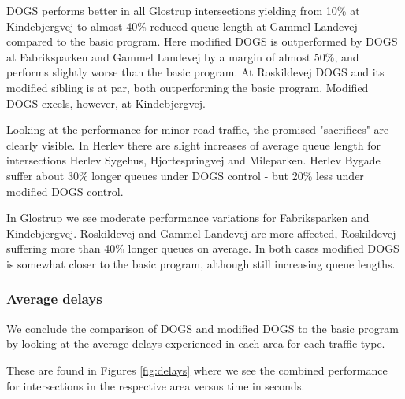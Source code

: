 DOGS performs better in all Glostrup intersections yielding from 10\% at Kindebjergvej to almost 40\% reduced queue length at Gammel Landevej compared to the basic program. Here modified DOGS is outperformed by DOGS at Fabriksparken and Gammel Landevej by a margin of almost 50\%, and performs slightly worse than the basic program. At Roskildevej DOGS and its modified sibling is at par, both outperforming the basic program. Modified DOGS excels, however, at Kindebjergvej.

Looking at the performance for minor road traffic, the promised "sacrifices" are clearly visible. In Herlev there are slight increases of average queue length for intersections Herlev Sygehus, Hjortespringvej and Mileparken. Herlev Bygade suffer about 30\% longer queues under DOGS control - but 20\% less under modified DOGS control.

In Glostrup we see moderate performance variations for Fabriksparken and Kindebjergvej. Roskildevej and Gammel Landevej are more affected, Roskildevej suffering more than 40\% longer queues on average. In both cases modified DOGS is somewhat closer to the basic program, although still increasing queue lengths.

\subsubsection*{Average delays}
We conclude the comparison of DOGS and modified DOGS to the basic program by looking at the average delays experienced in each area for each traffic type. 

These are found in Figures \ref{fig:delays} where we see the combined performance for intersections in the respective area versus time in seconds.

